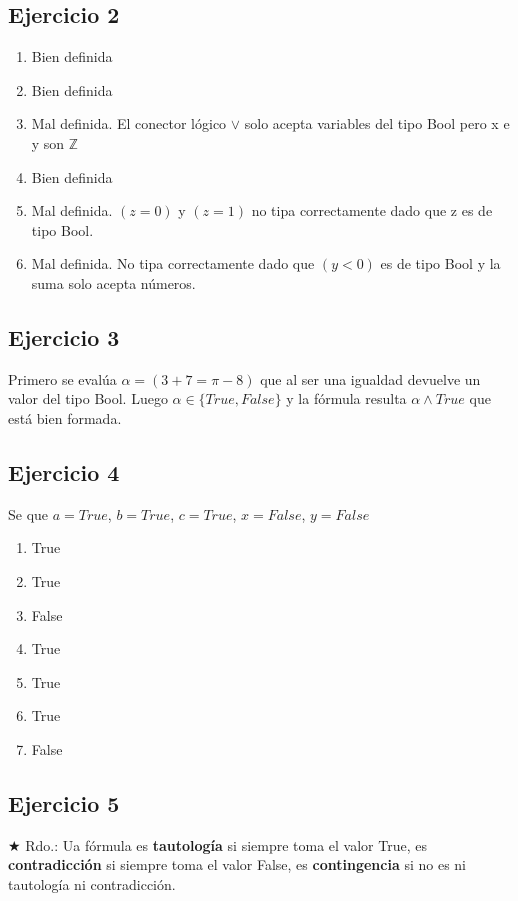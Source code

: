 \subsection{Ejercicio 2}
\begin{enumerate}
    \item Bien definida
    \item Bien definida
    \item Mal definida. El conector lógico $\vee$ solo acepta variables del tipo Bool pero x e y son $\mathbb{Z}$ 
    \item Bien definida
    \item Mal definida. $(z = 0)$ y $(z = 1)$ no tipa correctamente dado que z es de tipo Bool.
    \item Mal definida. No tipa correctamente dado que $(y < 0)$ es de tipo Bool y la suma solo acepta números.
\end{enumerate}

\subsection{Ejercicio 3}
Primero se evalúa $ \alpha = (3+7 = \pi - 8)$ que al ser una igualdad devuelve un valor del tipo Bool. Luego $\alpha \in \{True, False\}$
y la fórmula resulta $\alpha \wedge True$ que está bien formada.

\subsection{Ejercicio 4}
Se que $a = True$, $b = True$, $c = True$, $x = False$, $y = False$

\begin{enumerate}
    \item True
    \item True
    \item False
    \item True
    \item True
    \item True
    \item False
\end{enumerate}

\subsection{Ejercicio 5}
$\bigstar$ Rdo.: Ua fórmula es \textbf{tautología} si siempre toma el valor True, es \textbf{contradicción} si siempre toma el valor False,
es \textbf{contingencia} si no es ni tautología ni contradicción.


